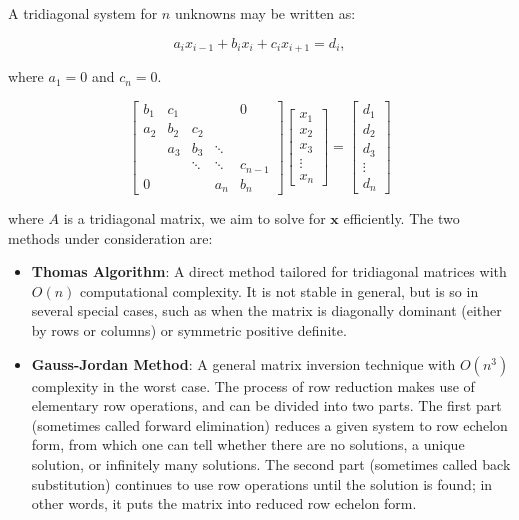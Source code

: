 \documentclass[a4paper,12pt]{article}
\begin{document}
A tridiagonal system for \( n \) unknowns may be written as:

\[
a_i x_{i-1} + b_i x_i + c_i x_{i+1} = d_i,
\]

where \( a_1 = 0 \) and \( c_n = 0 \).

\[
\begin{bmatrix}
b_{1} & c_{1} & & & 0 \\
a_{2} & b_{2} & c_{2} & & \\
& a_{3} & b_{3} & \ddots & \\
& & \ddots & \ddots & c_{n-1} \\
0 & & & a_{n} & b_{n}
\end{bmatrix}
\begin{bmatrix}
x_{1} \\ x_{2} \\ x_{3} \\ \vdots \\ x_{n}
\end{bmatrix}
=
\begin{bmatrix}
d_{1} \\ d_{2} \\ d_{3} \\ \vdots \\ d_{n}
\end{bmatrix}
\]

where \(A\) is a tridiagonal matrix, we aim to solve for \(\mathbf{x}\) efficiently. The two methods under consideration are:
\begin{itemize}
    \item \textbf{Thomas Algorithm}: A direct method tailored for tridiagonal matrices with \(O(n)\) computational complexity. It is not stable in general, but is so in several special cases, such as when the matrix is diagonally dominant (either by rows or columns) or symmetric positive definite.
    \item \textbf{Gauss-Jordan Method}: A general matrix inversion technique with \(O(n^3)\) complexity in the worst case. The process of row reduction makes use of elementary row operations, and can be divided into two parts. The first part (sometimes called forward elimination) reduces a given system to row echelon form, from which one can tell whether there are no solutions, a unique solution, or infinitely many solutions. The second part (sometimes called back substitution) continues to use row operations until the solution is found; in other words, it puts the matrix into reduced row echelon form.
\end{itemize}
\end{document}
